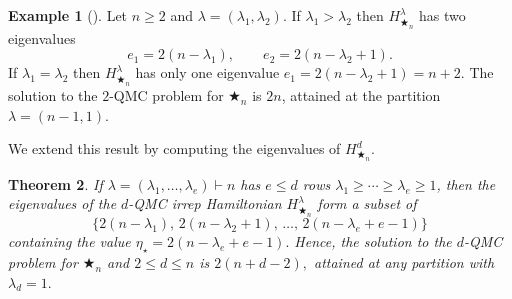 \documentclass[12pt,dvipsnames,accepted=2016-08-18,a4paper,onecolumn]{quantumarticle}
\def\starn{{\bigstar_{n}}}
\numberwithin{equation}{section}
\newtheorem{theorem}{Theorem}[section]
\theoremstyle{definition}
\newtheorem{example}[theorem]{Example}
\begin{document}
\begin{example}[{\cite[Lemma 6.1]{BCEHK24}}]\label{p:star2}
Let $n\ge 2$ and $\lambda=(\lambda_1,\lambda_2)$. If $\lambda_1>\lambda_2$ then $H_\starn^\lambda$ has two eigenvalues
$$e_1 = 2(n-\lambda_1), \quad \quad e_2 = 2(n-\lambda_2+1).
$$
If $\lambda_1=\lambda_2$ then $H_\starn^\lambda$ has only one eigenvalue $e_1 =2(n-\lambda_2+1)=n+2$.
The solution to the $2$-QMC problem for $\starn$ is $2n$, attained at the partition $\lambda=(n-1,1)$.
\end{example}


We extend this result by computing the eigenvalues of  $H_\starn^{d}.$
\begin{theorem}\label{th:Eigstarn}
    If $\lambda = (\lambda_1,\ldots, \lambda_e) \vdash n$ has $e \leq d$ rows $\lambda_1 \geq \cdots \geq \lambda_e \geq 1$, then the eigenvalues of the $d$-QMC irrep Hamiltonian $H_\starn^\lambda$  form a subset of 
$$
\{2(n-\lambda_1), \,2(n-\lambda_2+1),\, \ldots,\, 2(n-\lambda_{e}+e-1)\}
$$
containing the value $\eta_\star =2(n-\lambda_{e}+e-1).$ Hence, the solution to the $d$-QMC problem for $\starn$ {and $2\le d\le n$} is $2(n+d-2),$ attained at any partition with $\lambda_d=1.$
\end{theorem}
\end{document}
